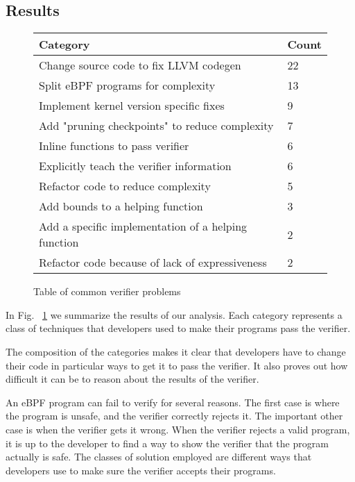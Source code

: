 \subsection{Results}

\begin{figure}
    \centering
    \begin{tabular}{|p{6cm}|p{1cm}|}
        \hline
        Category & Count \\
        \hline
        Change source code to fix LLVM codegen & 22 \\
        \hline
        Split eBPF programs for complexity & 13 \\
        \hline
        Implement kernel version specific fixes & 9 \\
        \hline
        Add "pruning checkpoints" to reduce complexity & 7 \\
        \hline
        Inline functions to pass verifier & 6 \\
        \hline
        Explicitly teach the verifier information & 6 \\
        \hline
        Refactor code to reduce complexity & 5 \\
        \hline
        Add bounds to a helping function & 3 \\
        \hline
        Add a specific implementation of a helping function & 2 \\
        \hline
        Refactor code because of lack of expressiveness & 2 \\
        \hline
    \end{tabular}
    \caption{Table of common verifier problems}
    \label{fig:commit-table}
\end{figure}

In Fig. ~\ref{fig:commit-table} we summarize the results of our analysis.
Each category represents a class of techniques that developers used to make their programs pass the verifier.

The composition of the categories makes it clear that developers have to change their code in particular ways to get it to pass the verifier.
It also proves out how difficult it can be to reason about the results of the verifier.

An eBPF program can fail to verify for several reasons.
The first case is where the program is unsafe, and the verifier correctly rejects it.
The important other case is when the verifier gets it wrong.
When the verifier rejects a valid program, it is up to the developer to find a way to show the verifier that the program actually is safe.
The classes of solution employed are different ways that developers use to make sure the verifier accepts their programs.

